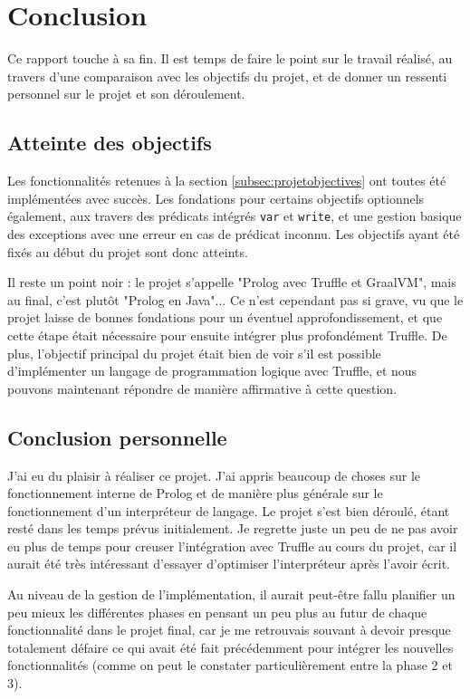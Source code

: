 \documentclass[../report.tex]{subfiles}
\begin{document}
\section{Conclusion}
Ce rapport touche à sa fin. Il est temps de faire le point sur le travail réalisé, au travers d'une comparaison avec les objectifs du projet, et de donner un ressenti personnel sur le projet et son déroulement.
\subsection{Atteinte des objectifs}
Les fonctionnalités retenues à la section \ref{subsec:projetobjectives} ont toutes été implémentées avec succès. Les fondations pour certains objectifs optionnels également, aux travers des prédicats intégrés \texttt{var} et \texttt{write}, et une gestion basique des exceptions avec une erreur en cas de prédicat inconnu. Les objectifs ayant été fixés au début du projet sont donc atteints.

Il reste un point noir : le projet s'appelle "Prolog avec Truffle et GraalVM", mais au final, c'est plutôt "Prolog en Java"... Ce n'est cependant pas si grave, vu que le projet laisse de bonnes fondations pour un éventuel approfondissement, et que cette étape était nécessaire pour ensuite intégrer plus profondément Truffle. De plus, l'objectif principal du projet était bien de voir s'il est possible d'implémenter un langage de programmation logique avec Truffle, et nous pouvons maintenant répondre de manière affirmative à cette question.
\subsection{Conclusion personnelle}
J'ai eu du plaisir à réaliser ce projet. J'ai appris beaucoup de choses sur le fonctionnement interne de Prolog et de manière plus générale sur le fonctionnement d'un interpréteur de langage. Le projet s'est bien déroulé, étant resté dans les temps prévus initialement. Je regrette juste un peu de ne pas avoir eu plus de temps pour creuser l'intégration avec Truffle au cours du projet, car il aurait été très intéressant d'essayer d'optimiser l'interpréteur après l'avoir écrit.

Au niveau de la gestion de l'implémentation, il aurait peut-être fallu planifier un peu mieux les différentes phases en pensant un peu plus au futur de chaque fonctionnalité dans le projet final, car je me retrouvais souvant à devoir presque totalement défaire ce qui avait été fait précédemment pour intégrer les nouvelles fonctionnalités (comme on peut le constater particulièrement entre la phase 2 et 3). 
\end{document}
